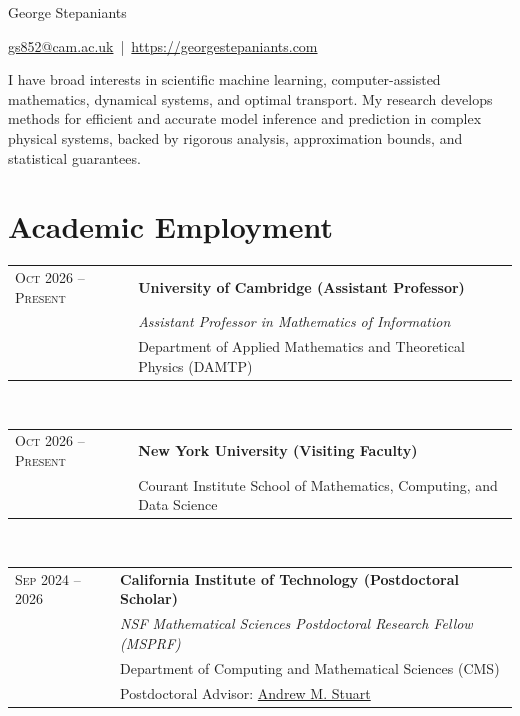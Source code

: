 \documentclass[a4paper,10pt]{article}
\begin{document}
\par{\centerline{
  {\Huge George Stepaniants}}\bigskip
  \centerline{\href{\detokenize{mailto:gs852@cam.ac.uk}}{gs852@cam.ac.uk} \,|\, \href{\detokenize{https://georgestepaniants.com}}{https://georgestepaniants.com}}
}\bigskip

I have broad interests in scientific machine learning, computer-assisted mathematics, dynamical systems, and optimal transport. My research develops methods for efficient and accurate model inference and prediction in complex physical systems, backed by rigorous analysis, approximation bounds, and statistical guarantees.

\section{Academic Employment}
\begin{tabular}{lp{13cm}}
\textsc{Oct} 2026 -- \textsc{Present} & \textbf{University of Cambridge (Assistant Professor)}\\
& \textit{Assistant Professor in Mathematics of Information}\\
& Department of Applied Mathematics and Theoretical Physics (DAMTP)\\
\end{tabular}\\

\begin{tabular}{lp{13cm}}
\textsc{Oct} 2026 -- \textsc{Present} & \textbf{New York University (Visiting Faculty)}\\
& Courant Institute School of Mathematics, Computing, and Data Science\\
\end{tabular}\\

\begin{tabular}{lp{13cm}}
\textsc{Sep} 2024 -- 2026 & \textbf{California Institute of Technology (Postdoctoral Scholar)}\\
& \textit{NSF Mathematical Sciences Postdoctoral Research Fellow (MSPRF)}\\
& Department of Computing and Mathematical Sciences (CMS)\\
& Postdoctoral Advisor: \href{\detokenize{http://stuart.caltech.edu/}}{Andrew M. Stuart}\\
\end{tabular}\\
\end{document}
